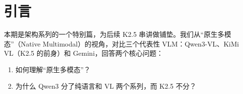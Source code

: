 \section{引言}

本期是架构系列的一个特别篇，为后续 K2.5 串讲做铺垫。我们从``原生多模态''（Native Multimodal）的视角，对比三个代表性 VLM：Qwen3-VL、KiMi VL（K2.5 的前身）和 Gemini，回答两个核心问题：
\begin{enumerate}
  \item 如何理解``原生多模态''？
  \item 为什么 Qwen3 分了纯语言和 VL 两个系列，而 K2.5 不分？
\end{enumerate}

